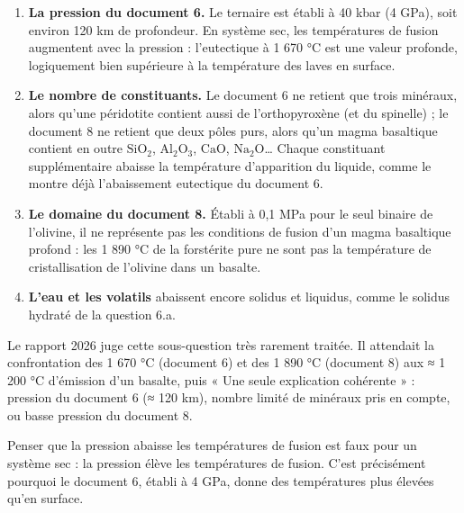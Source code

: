 \documentclass[11pt,a4paper]{article}
\providecommand{\tightlist}{\setlength{\itemsep}{0pt}\setlength{\parskip}{0pt}}
\begin{document}
\begin{enumerate}
\def\labelenumi{\arabic{enumi}.}
\tightlist
\item
  \textbf{La pression du document 6.} Le ternaire est établi à 40 kbar (4 GPa), soit environ 120 km de profondeur. En système sec, les températures de fusion augmentent avec la pression : l'eutectique à 1 670 °C est une valeur profonde, logiquement bien supérieure à la température des laves en surface.
\item
  \textbf{Le nombre de constituants.} Le document 6 ne retient que trois minéraux, alors qu'une péridotite contient aussi de l'orthopyroxène (et du spinelle) ; le document 8 ne retient que deux pôles purs, alors qu'un magma basaltique contient en outre \(\mathrm{SiO_2}\), \(\mathrm{Al_2O_3}\), \(\mathrm{CaO}\), \(\mathrm{Na_2O}\)\ldots{} Chaque constituant supplémentaire abaisse la température d'apparition du liquide, comme le montre déjà l'abaissement eutectique du document 6.
\item
  \textbf{Le domaine du document 8.} Établi à 0,1 MPa pour le seul binaire de l'olivine, il ne représente pas les conditions de fusion d'un magma basaltique profond : les 1 890 °C de la forstérite pure ne sont pas la température de cristallisation de l'olivine dans un basalte.
\item
  \textbf{L'eau et les volatils} abaissent encore solidus et liquidus, comme le solidus hydraté de la question 6.a.
\end{enumerate}

\begin{jury}

Le rapport 2026 juge cette sous-question très rarement traitée. Il attendait la confrontation des 1 670 °C (document 6) et des 1 890 °C (document 8) aux ≈ 1 200 °C d'émission d'un basalte, puis « Une seule explication cohérente » : pression du document 6 (≈ 120 km), nombre limité de minéraux pris en compte, ou basse pression du document 8.

\end{jury}

\begin{piege}

Penser que la pression abaisse les températures de fusion est faux pour un système sec : la pression élève les températures de fusion. C'est précisément pourquoi le document 6, établi à 4 GPa, donne des températures plus élevées qu'en surface.

\end{piege}
\end{document}
